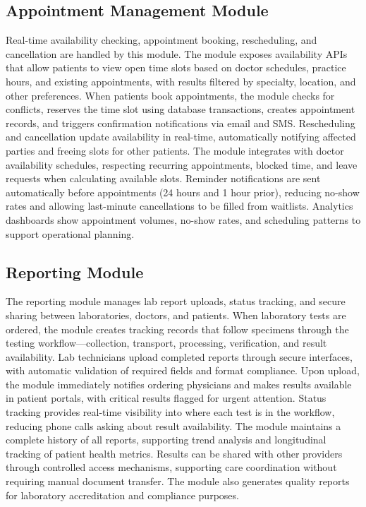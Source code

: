 \subsection{Appointment Management Module}

\justifying
\noindent Real-time availability checking, appointment booking, rescheduling, and cancellation are handled by this module. The module exposes availability APIs that allow patients to view open time slots based on doctor schedules, practice hours, and existing appointments, with results filtered by specialty, location, and other preferences. When patients book appointments, the module checks for conflicts, reserves the time slot using database transactions, creates appointment records, and triggers confirmation notifications via email and SMS. Rescheduling and cancellation update availability in real-time, automatically notifying affected parties and freeing slots for other patients. The module integrates with doctor availability schedules, respecting recurring appointments, blocked time, and leave requests when calculating available slots. Reminder notifications are sent automatically before appointments (24 hours and 1 hour prior), reducing no-show rates and allowing last-minute cancellations to be filled from waitlists. Analytics dashboards show appointment volumes, no-show rates, and scheduling patterns to support operational planning.

\subsection{Reporting Module}

\justifying
\noindent The reporting module manages lab report uploads, status tracking, and secure sharing between laboratories, doctors, and patients. When laboratory tests are ordered, the module creates tracking records that follow specimens through the testing workflow—collection, transport, processing, verification, and result availability. Lab technicians upload completed reports through secure interfaces, with automatic validation of required fields and format compliance. Upon upload, the module immediately notifies ordering physicians and makes results available in patient portals, with critical results flagged for urgent attention. Status tracking provides real-time visibility into where each test is in the workflow, reducing phone calls asking about result availability. The module maintains a complete history of all reports, supporting trend analysis and longitudinal tracking of patient health metrics. Results can be shared with other providers through controlled access mechanisms, supporting care coordination without requiring manual document transfer. The module also generates quality reports for laboratory accreditation and compliance purposes.

